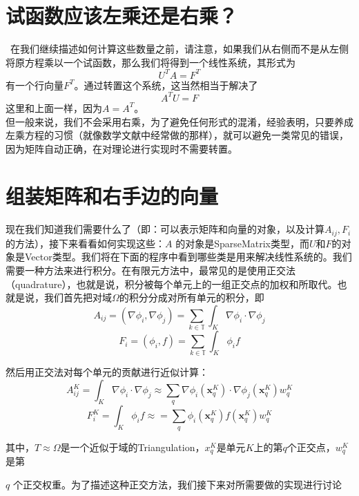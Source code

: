 \documentclass[nofonts]{ctexart} %
\begin{document}
\section{试函数应该左乘还是右乘？}\
在我们继续描述如何计算这些数量之前，请注意，如果我们从右侧而不是从左侧将原方程乘以一个试函数，那么我们将得到一个线性系统，其形式为
\begin{equation}
    U^TA=F^T
\end{equation}
有一个行向量$F^{T}$。通过转置这个系统，这当然相当于解决了
\begin{equation}
    A^TU=F
\end{equation}
这里和上面一样，因为$A=A^{T}$。\\
但一般来说，我们不会采用右乘，为了避免任何形式的混淆，经验表明，只要养成左乘方程的习惯（就像数学文献中经常做的那样），就可以避免一类常见的错误，因为矩阵自动正确，在对理论进行实现时不需要转置。
\section{组装矩阵和右手边的向量}
现在我们知道我们需要什么了（即：可以表示矩阵和向量的对象，以及计算$A_{ij},F_i$
的方法），接下来看看如何实现这些：$A$
的对象是SparseMatrix类型，而$U$和$F$的对象是Vector类型。我们将在下面的程序中看到哪些类是用来解决线性系统的。我们需要一种方法来进行积分。在有限元方法中，最常见的是使用正交法（quadrature），也就是说，积分被每个单元上的一组正交点的加权和所取代。也就是说，我们首先把对域$\Omega$的积分分成对所有单元的积分，即
\begin{equation}
    A_{ij}=(\nabla\phi_i,\nabla\phi_j)=\sum_{k\in\mathbb{T}}\int_K\nabla\phi_i\cdot\nabla\phi_j
\end{equation}
\begin{equation}
    F_i=(\phi_i,f)=\sum_{k\in\mathbb{T}}\int_K\phi_if
\end{equation}


然后用正交法对每个单元的贡献进行近似计算：
\begin{equation}
    A_{ij}^K=\int_K\nabla\phi_i\cdot\nabla\phi_j\approx\sum_q\nabla\phi_i(\mathbf{x}_q^K)\cdot\nabla\phi_j(\mathbf{x}_q^K)w_q^K
\end{equation}
\begin{equation}
 F_i^K=\int_K\phi_if\approx=\sum_q\phi_i(\mathbf{x}_q^K)f(\mathbf{x}_q^K)w_q^K   
\end{equation}

其中，$T\approx\Omega $是一个近似于域的Triangulation，$x_q^K$是单元$K$上的第$q$个正交点，$w_q^K$是第

   $q$ 个正交权重。为了描述这种正交方法，我们接下来对所需要做的实现进行讨论
\end{document}
